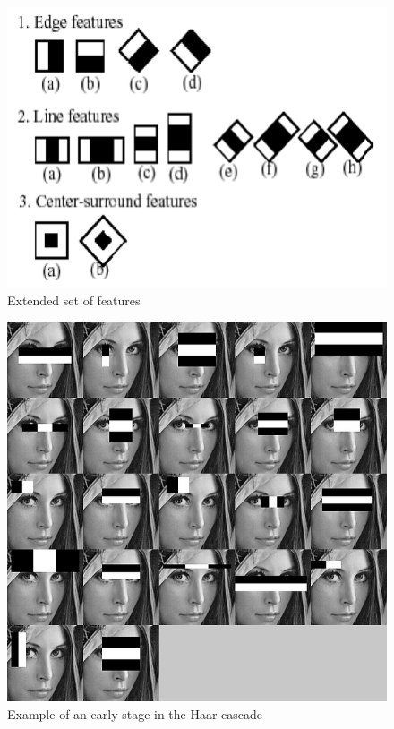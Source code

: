 \begin{figure}[!h]
\begin{center}
\noindent \includegraphics[scale=0.6]{figures/haar_features_extended} 
\newline
\caption{Extended set of features}
\label{haar_features_extended}
\end{center} 
\end{figure}

\begin{figure}[!h]
\begin{center}
\noindent \includegraphics[scale=0.5]{figures/haar_features_early_stage} 
\newline
\caption{Example of an early stage in the Haar cascade}
\label{haar_features_early_stage}
\end{center} 
\end{figure}

